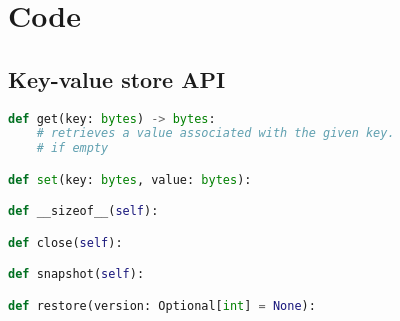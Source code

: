 

\chapter{Code} %

\label{Appendix-A-code} %

\section{Key-value store API}

\begin{lstlisting}[language=Python, caption=API function signatures.]
def get(key: bytes) -> bytes:
    # retrieves a value associated with the given key.
    # if empty

def set(key: bytes, value: bytes):

def __sizeof__(self):

def close(self):

def snapshot(self):

def restore(version: Optional[int] = None):

\end{lstlisting}
    